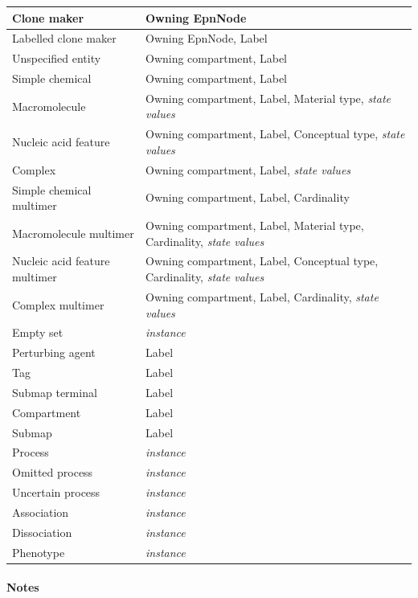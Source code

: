 \begin{center}
\begin{small}
\begin{supertabular}{|p{4.5cm}|p{10cm}|}
Clone maker & Owning EpnNode \\\hline
Labelled clone maker & Owning EpnNode, Label \\\hline
Unspecified entity & Owning compartment, Label \\\hline
Simple chemical & Owning compartment, Label \\\hline
Macromolecule & Owning compartment, Label, Material type, \emph{state values} \\\hline
Nucleic acid feature & Owning compartment, Label, Conceptual type, \emph{state values} \\\hline
Complex & Owning compartment, Label,  \emph{state values} \\\hline
Simple chemical multimer & Owning compartment, Label, Cardinality \\\hline
Macromolecule multimer & Owning compartment, Label, Material type, Cardinality, \emph{state values} \\\hline
Nucleic acid feature multimer & Owning compartment, Label, Conceptual type, Cardinality, \emph{state values} \\\hline
Complex multimer & Owning compartment, Label, Cardinality,  \emph{state values} \\\hline
Empty set & \emph{instance} \\\hline
Perturbing agent & Label \\\hline
Tag & Label \\\hline
Submap terminal & Label \\\hline
Compartment & Label \\\hline
Submap & Label \\\hline
Process & \emph{instance} \\\hline
Omitted process & \emph{instance} \\\hline
Uncertain process & \emph{instance} \\\hline
Association & \emph{instance} \\\hline
Dissociation & \emph{instance} \\\hline
Phenotype & \emph{instance} \\\hline
\end{supertabular}
\end{small}
\end{center}


\paragraph*{Notes}

